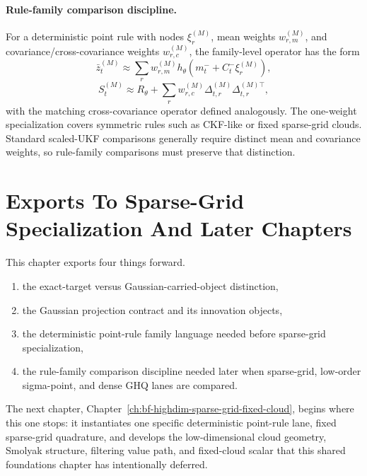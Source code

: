 \paragraph{Rule-family comparison discipline.}
For a deterministic point rule with nodes \(\xi_r^{(M)}\), mean weights
\(w_{r,m}^{(M)}\), and covariance/cross-covariance weights \(w_{r,c}^{(M)}\),
the family-level operator has the form
\begin{equation}
  \bar z_t^{(M)}
  \approx
  \sum_r w_{r,m}^{(M)} h_\theta(m_t^-+C_t^-\xi_r^{(M)}),
  \label{eq:bf-hd-gq-family-zbar}
\end{equation}
\begin{equation}
  S_t^{(M)}
  \approx
  R_\theta+
  \sum_r w_{r,c}^{(M)}\Delta_{t,r}^{(M)}\Delta_{t,r}^{(M)\top},
  \label{eq:bf-hd-gq-family-S}
\end{equation}
with the matching cross-covariance operator defined analogously.  The one-weight
specialization covers symmetric rules such as CKF-like or fixed sparse-grid
clouds.  Standard scaled-UKF comparisons generally require distinct mean and
covariance weights, so rule-family comparisons must preserve that distinction.

\section{Exports To Sparse-Grid Specialization And Later Chapters}
\label{sec:bf-hd-gq-exports}

This chapter exports four things forward.
\begin{enumerate}[label=(\arabic*), leftmargin=0.28in]
  \item the exact-target versus Gaussian-carried-object distinction,
  \item the Gaussian projection contract and its innovation objects,
  \item the deterministic point-rule family language needed before sparse-grid
  specialization,
  \item the rule-family comparison discipline needed later when sparse-grid,
  low-order sigma-point, and dense GHQ lanes are compared.
\end{enumerate}

The next chapter, Chapter~\ref{ch:bf-highdim-sparse-grid-fixed-cloud}, begins
where this one stops: it instantiates one specific deterministic point-rule lane,
fixed sparse-grid quadrature, and develops the low-dimensional cloud geometry,
Smolyak structure, filtering value path, and fixed-cloud scalar that this shared
foundations chapter has intentionally deferred.
